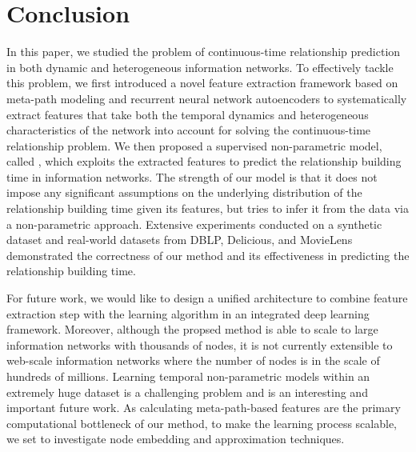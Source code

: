\section{Conclusion}\label{sec:conclusion}
In this paper, we studied the problem of continuous-time relationship prediction in both dynamic and heterogeneous information networks. To effectively tackle this problem, we first introduced a novel feature extraction framework based on meta-path modeling and recurrent neural network autoencoders to systematically extract features that take both the temporal dynamics and heterogeneous characteristics of the network into account for solving the continuous-time relationship problem. We then proposed a supervised non-parametric model, called \npglm, which exploits the extracted features to predict the relationship building time in information networks. The strength of our model is that it does not impose any significant assumptions on the underlying distribution of the relationship building time given its features, but tries to infer it from the data via a non-parametric approach. Extensive experiments conducted on a synthetic dataset and real-world datasets from DBLP, Delicious, and MovieLens demonstrated the correctness of our method and its effectiveness in predicting the relationship building time.

{For future work, we would like to design a unified architecture to combine feature extraction step with the learning algorithm in an integrated deep learning framework. Moreover, although the propsed method is able to scale to large information networks with thousands of nodes, it is not currently extensible to web-scale information networks where the number of nodes is in the scale of hundreds of millions. Learning temporal non-parametric models within an extremely huge dataset is a challenging problem and is an interesting and important future work. As calculating meta-path-based features are the primary computational bottleneck of our method, to make the learning process scalable, we set to investigate node embedding and approximation techniques.}
